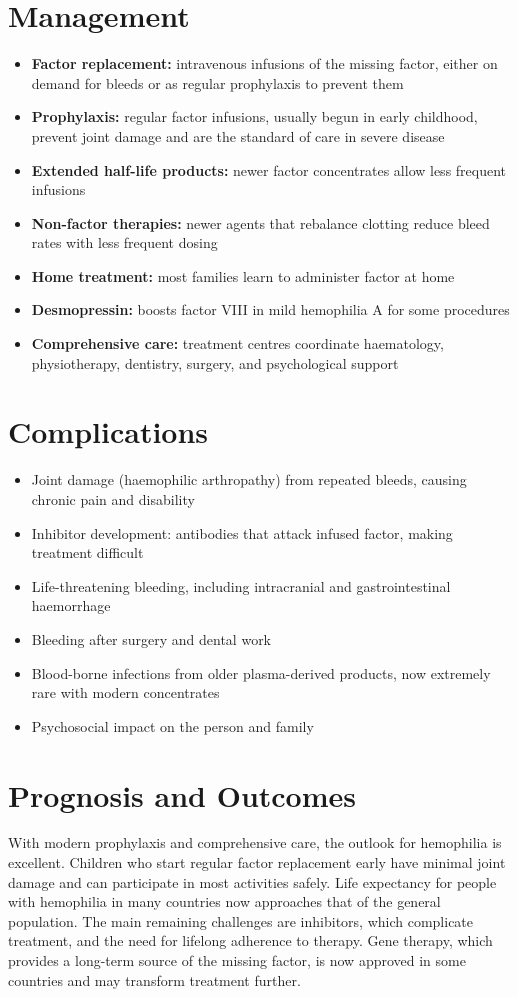 \section*{Management}
\begin{itemize}
    \item \textbf{Factor replacement:} intravenous infusions of the missing factor, either on demand for bleeds or as regular prophylaxis to prevent them
    \item \textbf{Prophylaxis:} regular factor infusions, usually begun in early childhood, prevent joint damage and are the standard of care in severe disease
    \item \textbf{Extended half-life products:} newer factor concentrates allow less frequent infusions
    \item \textbf{Non-factor therapies:} newer agents that rebalance clotting reduce bleed rates with less frequent dosing
    \item \textbf{Home treatment:} most families learn to administer factor at home
    \item \textbf{Desmopressin:} boosts factor VIII in mild hemophilia A for some procedures
    \item \textbf{Comprehensive care:} treatment centres coordinate haematology, physiotherapy, dentistry, surgery, and psychological support
\end{itemize}

\section*{Complications}
\begin{itemize}
    \item Joint damage (haemophilic arthropathy) from repeated bleeds, causing chronic pain and disability
    \item Inhibitor development: antibodies that attack infused factor, making treatment difficult
    \item Life-threatening bleeding, including intracranial and gastrointestinal haemorrhage
    \item Bleeding after surgery and dental work
    \item Blood-borne infections from older plasma-derived products, now extremely rare with modern concentrates
    \item Psychosocial impact on the person and family
\end{itemize}

\section*{Prognosis and Outcomes}
With modern prophylaxis and comprehensive care, the outlook for hemophilia is excellent. Children who start regular factor replacement early have minimal joint damage and can participate in most activities safely. Life expectancy for people with hemophilia in many countries now approaches that of the general population. The main remaining challenges are inhibitors, which complicate treatment, and the need for lifelong adherence to therapy. Gene therapy, which provides a long-term source of the missing factor, is now approved in some countries and may transform treatment further.

